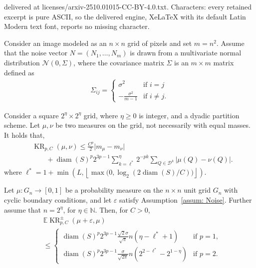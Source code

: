 \documentclass[10pt,a4paper]{amsart}
\DeclareMathOperator{\diam}{diam}
\begin{document}
delivered at licenses/arxiv-2510.01015-CC-BY-4.0.txt. Characters: every retained excerpt is pure ASCII, so the delivered engine, XeLaTeX with its default Latin Modern text font, reports no missing character.
\begin{assumption}
\label{assum: Noise}
Consider an image modeled as an $n \times n$ grid of pixels and set $m= n^2$. Assume that the noise vector $N = (N_1, \ldots, N_m)$ is drawn from a multivariate normal distribution $\mathcal{N}(0, \Sigma)$, where the covariance matrix $\Sigma$ is an $m \times m$ matrix defined as
\begin{align}
\Sigma_{ij} =
\begin{cases}
    \sigma^2 & \text{if } i=j \\
    -\frac{\sigma^2}{m-1} & \text{if } i \ne j.
\end{cases}
\end{align}
\end{assumption}

\begin{prop}
\label{prop: KR}
Consider a square $2^\eta\times 2^\eta$ grid, where $\eta \ge 0$ is integer, and a dyadic partition scheme. Let $\mu, \nu$ be two measures on the grid, not necessarily with equal masses. 
It holds that,
\begin{align}
&\operatorname{KR}_{p,C}(\mu, \nu)  \le
        \frac{C^p}{2}
            \lvert m_\mu - m_\nu\rvert
            \\&\qquad+
           \diam(S)^p  2^{3p-1}
            \sum_{k=\ell^*}^{\eta}
            2^{-pk}
            \sum _{Q\in \mathcal{D}^k}
            \lvert
                \mu(Q)-\nu(Q)
            \rvert.    \nonumber
\end{align}
where
\(
\ell^*=1+ \min\left( L, \left\lfloor \max\big(0 , \log_2 \left( 2\diam(S)/C  \right)\big) \right\rfloor \right).
\)
\end{prop}

\begin{thm}
\label{thm: KR between a measure and its noisy counterpart}
Let $\mu : G_n \to [0,1]$ be a probability measure on the $n\times n$ unit grid $G_n$ with cyclic boundary conditions, and let $\varepsilon$ satisfy Assumption~\ref{assum: Noise}. Further assume that $n = 2 ^\eta$, for $\eta \in \mathbb{N}$. Then, for $C>0$,
\begin{align}
\label{eq: KR_cases}
    &\mathbb{E} \operatorname{KR}_{p,C}^\pm(\mu+\varepsilon,\mu) \\
    &\le \begin{cases} 
          \diam(S)^p 2^{3p-1} \frac{\sqrt{2}\sigma}{\sqrt{\pi}} n (\eta-\ell^*+1) & \text{if } p=1, \\[1ex]
        \diam(S)^p 2^{3p-1} \frac{\sigma}{\sqrt{2\pi}}  n (2^{2-\ell^*} - 2^{1-\eta}) & \text{if } p=2.
    \end{cases} \nonumber
\end{align}
\end{thm}
\end{document}
